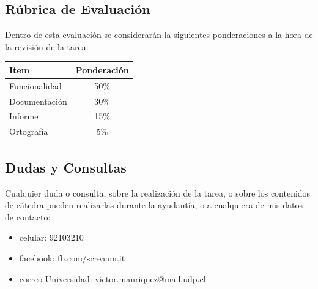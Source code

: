 \documentclass[paper=a4, fontsize=11pt]{scrartcl} %
\numberwithin{equation}{section} %
\numberwithin{figure}{section} %
\numberwithin{table}{section} %
\begin{document}

\subsection{Rúbrica de Evaluación}
Dentro de esta evaluación se considerarán la siguientes ponderaciones a la hora de la revisión de la tarea.
\begin{table}[h!]
\centering
\begin{tabular}{||l || c||}
\hline
\hline
Item & Ponderación \\
\hline
Funcionalidad & 50\% \\
Documentación & 30\% \\
Informe & 15\% \\
Ortografía & 5\% \\
\hline
\hline
\end{tabular}
\end{table}
\subsection{Dudas y Consultas}
Cualquier duda o consulta, sobre la realización de la tarea, o sobre los contenidos de cátedra pueden realizarlas durante la ayudantía, o a cualquiera de mis datos de contacto:
\begin{itemize}

\item celular: 92103210
\item facebook: fb.com/screaam.it
\item correo Universidad: victor.manriquez@mail.udp.cl
\end{itemize}
\end{document}
